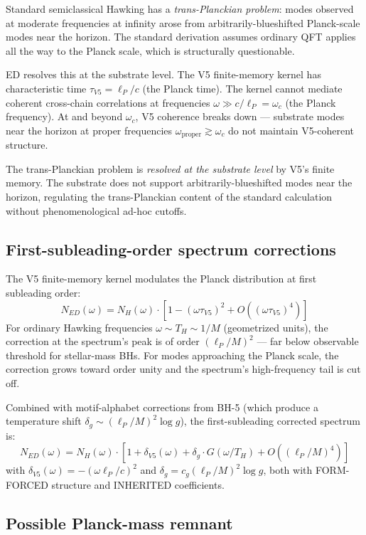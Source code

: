 \documentclass[11pt,a4paper]{article}
\begin{document}
Standard semiclassical Hawking has a \emph{trans-Planckian problem}: modes observed at moderate frequencies at infinity arose from arbitrarily-blueshifted Planck-scale modes near the horizon. The standard derivation assumes ordinary QFT applies all the way to the Planck scale, which is structurally questionable.

ED resolves this at the substrate level. The V5 finite-memory kernel has characteristic time $\tau_{V5} = \ell_P/c$ (the Planck time). The kernel cannot mediate coherent cross-chain correlations at frequencies $\omega \gg c/\ell_P = \omega_c$ (the Planck frequency). At and beyond $\omega_c$, V5 coherence breaks down --- substrate modes near the horizon at proper frequencies $\omega_{\mathrm{proper}} \gtrsim \omega_c$ do not maintain V5-coherent structure.

The trans-Planckian problem is \emph{resolved at the substrate level} by V5's finite memory. The substrate does not support arbitrarily-blueshifted modes near the horizon, regulating the trans-Planckian content of the standard calculation without phenomenological ad-hoc cutoffs.

\subsection{First-subleading-order spectrum corrections}

The V5 finite-memory kernel modulates the Planck distribution at first subleading order:
\[
N_{ED}(\omega) = N_H(\omega) \cdot [1 - (\omega\tau_{V5})^{2} + O((\omega\tau_{V5})^4)]
\]
For ordinary Hawking frequencies $\omega \sim T_H \sim 1/M$ (geometrized units), the correction at the spectrum's peak is of order $(\ell_P/M)^2$ --- far below observable threshold for stellar-mass BHs. For modes approaching the Planck scale, the correction grows toward order unity and the spectrum's high-frequency tail is cut off.

Combined with motif-alphabet corrections from BH-5 (which produce a temperature shift $\delta_g \sim (\ell_P/M)^2 \log g$), the first-subleading corrected spectrum is:
\[
N_{ED}(\omega) = N_H(\omega) \cdot [1 + \delta_{V5}(\omega) + \delta_g \cdot G(\omega/T_H) + O((\ell_P/M)^4)]
\]
with $\delta_{V5}(\omega) = -(\omega\ell_P/c)^2$ and $\delta_g = c_g(\ell_P/M)^2\log g$, both with FORM-FORCED structure and INHERITED coefficients.

\subsection{Possible Planck-mass remnant}
\end{document}

